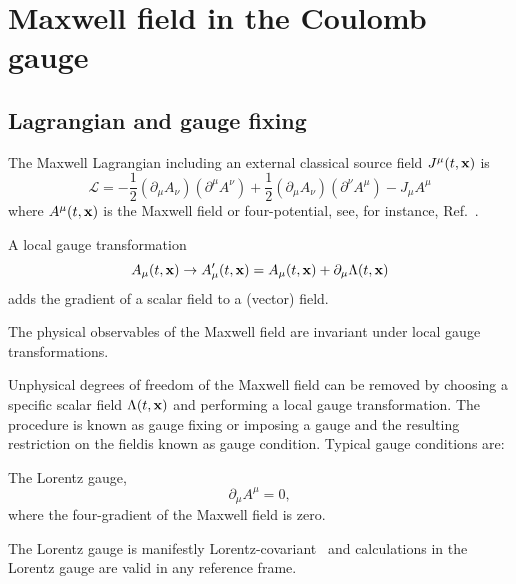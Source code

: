 \section{Maxwell field in the Coulomb gauge}

\subsection{Lagrangian and gauge fixing}

\begin{definition}
	The Maxwell Lagrangian including an external classical source field $J^\mu(t,\vb{x})$ is
	\begin{equation}
		\mathcal{L}
		=
		-
		\frac{1}{2}
		(\partial_\mu A_\nu)
		(\partial^\mu A^\nu)
		+
		\frac{1}{2}
		(\partial_\mu A_\nu)
		(\partial^\nu A^\mu)
		-
		J_\mu A^\mu
		\label{eq:mw_lagrangian}
	\end{equation}
	where $A^\mu(t,\vb{x})$ is the Maxwell field or four-potential, see, for instance, Ref.~\cite[p.~339]{Srednicki2007}.
\end{definition}
\begin{definition}
	A local gauge transformation
	\begin{equation}
		A_\mu(t,\vb{x})
		\to
		A_\mu^\prime(t,\vb{x})
		=
		A_\mu(t,\vb{x})
		+
		\partial_\mu\Lambda(t,\vb{x})
		\label{eq:mw_local_gauge_transform}
	\end{equation}
	adds the gradient of a scalar field to a (vector) field.
\end{definition}
\begin{theorem}\label{thm:mw_local_gauge_invariance}
	The physical observables of the Maxwell field are invariant under local gauge transformations.
\end{theorem}
Unphysical degrees of freedom of the Maxwell field can be removed by choosing a specific scalar field $\Lambda(t,\vb{x})$ and performing a local gauge transformation.
The procedure is known as gauge fixing or imposing a gauge and the resulting restriction on the fieldis known as gauge condition.
Typical gauge conditions are:
\begin{definition}
	The Lorentz gauge,
	\begin{equation}
		\partial_\mu
		A^\mu
		=
		0
		,
	\end{equation}
	where the four-gradient of the Maxwell field is zero.
\end{definition}
The Lorentz gauge is manifestly Lorentz-covariant~\cite[p.~144]{Greiner2013} and calculations in the Lorentz gauge are valid in any reference frame.
